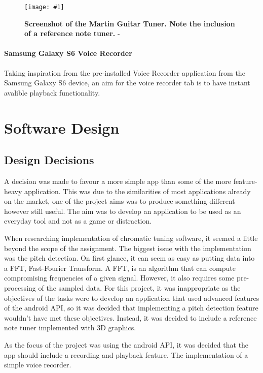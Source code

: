\documentclass[conference]{acmsiggraph}
\newcommand{\figuremacroW}[4]{
	\begin{figure}[H] %
		\centering
		\texttt{[image: \#1]}
		\caption[#2]{\textbf{#2} - #3}
		\label{fig:#1}
	\end{figure}
}
\begin{document}
\figuremacroW
{martinTuner}
{Screenshot of the Martin Guitar Tuner. Note the inclusion of a reference note tuner.}
{\protect\cite{Martin}}
{1.0}

\paragraph{Samsung Galaxy S6 Voice Recorder}

Taking inspiration from the pre-installed Voice Recorder application from the Samsung Galaxy S6 device, an aim for the voice recorder tab is to have instant avalible playback functionality.

\section{Software Design}

\subsection{Design Decisions}

A decision was made to favour a more simple app than some of the more feature-heavy application. This was due to the similarities of most applications already on the market, one of the project aims was to produce something different however still useful. The aim was to develop an application to be used as an everyday tool and not as a game or distraction.

When researching implementation of chromatic tuning software, it seemed a little beyond the scope of the assignment. The biggest issue with the implementation was the pitch detection. On first glance, it can seem as easy as putting data into a FFT, Fast-Fourier Transform. A FFT, is an algorithm that can compute compromising frequencies of a given signal. \cite{FFT} However, it also requires some pre-processing of the sampled data. For this project, it was inappropriate as the objectives of the tasks were to develop an application that used advanced features of the android API, so it was decided that implementing a pitch detection feature wouldn't have met these objectives. Instead, it was decided to include a reference note tuner implemented with 3D graphics.


As the focus of the project was using the android API, it was decided that the app should include a recording and playback feature. The implementation of a simple voice recorder. %
\end{document}
